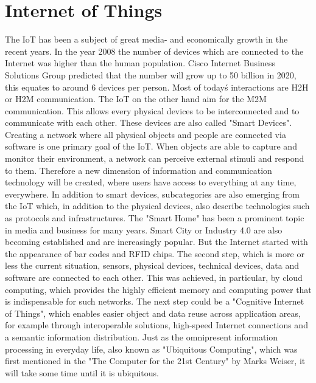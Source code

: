 \section{Internet of Things}
The \ac{IoT} has been a subject of great media- and economically growth in the recent years.
In the year 2008 the number of devices which are connected to the Internet was higher than the human population.\autocite[cf.][p. 3]{Eva:2011}
Cisco Internet Business Solutions Group predicted that the number will grow up to 50 billion in 2020, this equates to around 6 devices per person.\autocite[cf.][p. 4]{Eva:2011}
Most of today\'s interactions are \ac{H2H} or \ac{H2M} communication.
The \ac{IoT} on the other hand aim for the \ac{M2M} communication.
This allows every physical devices to be interconnected and to communicate with each other.
These devices are also called "Smart Devices".
Creating a network where all physical objects and people are connected via software is one primary goal of the \ac{IoT}.\autocite[cf.][p.206]{Rui:2015}\autocite[cf.][p.2]{Kra:2013}
When objects are able to capture and monitor their environment, a network can perceive external stimuli and respond to them.\autocite[cf.][p. 40]{Itu11}
Therefore a new dimension of information and communication technology will be created, where users have access to everything at any time, everywhere.
In addition to smart devices, subcategories are also emerging from the \ac{IoT} which, in addition to the physical devices, also describe technologies such as protocols and infrastructures.
The "Smart Home" has been a prominent topic in media and business for many years.
Smart City or Industry 4.0 are also becoming established and are increasingly popular.
But the Internet started with the appearance of bar codes and \ac{RFID} chips.\autocite[cf.][p. 13]{Kra:2013}
The second step, which is more or less the current situation, sensors, physical devices, technical devices, data and software are connected to each other.\autocite[cf.][p. 13]{Kra:2013}
This was achieved, in particular, by cloud computing, which provides the highly efficient memory and computing power that is indispensable for such networks.\autocite[cf.][p. 206]{Rui:2015}
The next step could be a "Cognitive Internet of Things", which enables easier object and data reuse across application areas, for example through interoperable solutions, high-speed Internet connections and a semantic information distribution.\autocite[cf.][p. V]{Kra:2013}
Just as the omnipresent information processing in everyday life, also known as "Ubiquitous Computing", which was first mentioned in the "The Computer for the 21st Century"\autocite{Wei:1991} by Marks Weiser, it will take some time until it is ubiquitous.


